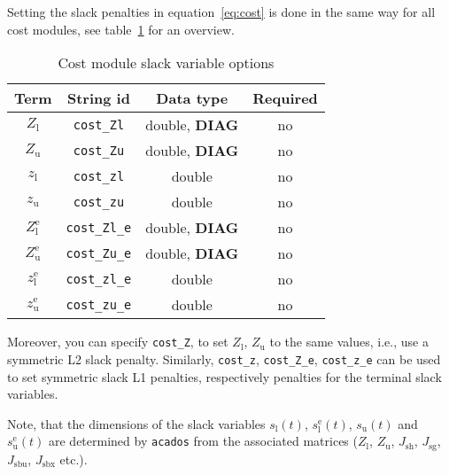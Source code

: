 \documentclass[english]{article}
\newcommand{\code}[1]{\texttt{#1}}
\newcommand{\acados}{\texttt{acados}}
\newcommand{\ind}[1]{_{\textrm{#1}}}
\newcommand{\terminal}{^{\textrm{e}}}
\newcommand{\Lower}{\ind{l}}
\newcommand{\upper}{\ind{u}}
\newcommand{\optional}{no}
\begin{document}
Setting the slack penalties in equation~\eqref{eq:cost} is done in the same way for all cost modules, see table~\ref{tab:cost:slack} for an overview.
%
\begin{table}[ht!]
    \centering
    \caption{Cost module slack variable options} \label{tab:cost:slack}
    \begin{tabular}{cccc}
        \toprule
        Term  & String id & Data type & Required \\ \midrule
        $ Z\Lower $          & \code{cost\_Zl}    & double, \textbf{DIAG}  & \optional \\
        $ Z\upper $          & \code{cost\_Zu}    & double, \textbf{DIAG}  & \optional   \\
        $ z\Lower $          & \code{cost\_zl}    & double  & \optional   \\
        $ z\upper $          & \code{cost\_zu}    & double  & \optional   \\ [1em]
        $ Z\Lower\terminal $ & \code{cost\_Zl\_e} & double, \textbf{DIAG} & \optional   \\
        $ Z\upper\terminal $ & \code{cost\_Zu\_e} & double, \textbf{DIAG} & \optional   \\
        $ z\Lower\terminal $ & \code{cost\_zl\_e} & double  & \optional   \\
        $ z\upper\terminal $ & \code{cost\_zu\_e} & double  & \optional   \\
        \bottomrule
    \end{tabular}
\end{table}
%
Moreover, you can specify \code{cost\_Z}, to set $ Z\Lower$, $Z\upper$ to the same values, i.e., use a symmetric L2 slack penalty.
Similarly, \code{cost\_z}, \code{cost\_Z\_e}, \code{cost\_z\_e} can be used to set symmetric slack L1 penalties, respectively penalties for the terminal slack variables.

Note, that the dimensions of the slack variables $s\Lower(t)$, $s\Lower\terminal(t)$, $s\upper(t)$ and $s\upper\terminal(t)$ are determined by \acados{} from the associated matrices ($Z\Lower$, $Z\upper$,  $J\ind{sh}$, $J\ind{sg}$, $J\ind{sbu}$, $J\ind{sbx}$ etc.).
%
\end{document}
